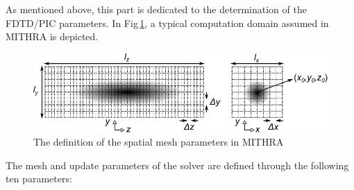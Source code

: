 As mentioned above, this part is dedicated to the determination of the FDTD/PIC parameters.
%
In Fig\,\ref{RefcardFig1}, a typical computation domain assumed in MITHRA is depicted.
%
\begin{figure}
\centering
\includegraphics[width=5.0in]{./MITHRA_UI/Fig1.pdf}
\caption{The definition of the spatial mesh parameters in MITHRA}
\label{RefcardFig1}
\end{figure}
%
The mesh and update parameters of the solver are defined through the following ten parameters:
%
